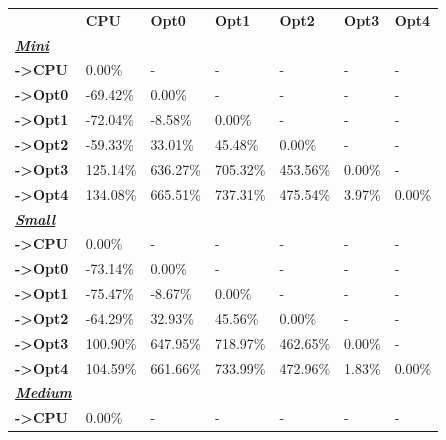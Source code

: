 \begin{table}[H]
    \centering
    \begin{tabular}{lllllll}
    \rowcolor[HTML]{DAE8FC} \ &  \textbf{CPU} &  \textbf{Opt0} &  \textbf{Opt1} &  \textbf{Opt2} &  \textbf{Opt3} &  \textbf{Opt4} \\
    \cellcolor[HTML]{DAE8FC} \textbf{\textbf{{\emph{{\underline{{Mini}}}}}}} &  &  &  &  &  &  \\
    \rowcolor[HTML]{EFEFEF} \cellcolor[HTML]{DAE8FC} \textbf{->CPU} & 0.00\% & - & - & - & - & - \\
    \cellcolor[HTML]{DAE8FC} \textbf{->Opt0} & -69.42\% & 0.00\% & - & - & - & - \\
    \rowcolor[HTML]{EFEFEF} \cellcolor[HTML]{DAE8FC} \textbf{->Opt1} & -72.04\% & -8.58\% & 0.00\% & - & - & - \\
    \cellcolor[HTML]{DAE8FC} \textbf{->Opt2} & -59.33\% & 33.01\% & 45.48\% & 0.00\% & - & - \\
    \rowcolor[HTML]{EFEFEF} \cellcolor[HTML]{DAE8FC} \textbf{->Opt3} & 125.14\% & 636.27\% & 705.32\% & 453.56\% & 	0.00\% & - \\
    \cellcolor[HTML]{DAE8FC} \textbf{->Opt4} & 134.08\% & 665.51\% & 737.31\% & 475.54\% & 	3.97\% & 	0.00\% \\
    \rowcolor[HTML]{EFEFEF} \cellcolor[HTML]{DAE8FC} \textbf{\textbf{{\emph{{\underline{{Small}}}}}}} &  &  &  &  &  &  \\
    \cellcolor[HTML]{DAE8FC} \textbf{->CPU} & 0.00\% & - & - & - & - & - \\
    \rowcolor[HTML]{EFEFEF} \cellcolor[HTML]{DAE8FC} \textbf{->Opt0} & -73.14\% & 0.00\% & - & - & - & - \\
    \cellcolor[HTML]{DAE8FC} \textbf{->Opt1} & -75.47\% & -8.67\% & 0.00\% & - & - & - \\
    \rowcolor[HTML]{EFEFEF} \cellcolor[HTML]{DAE8FC} \textbf{->Opt2} & -64.29\% & 32.93\% & 45.56\% & 0.00\% & - & - \\
    \cellcolor[HTML]{DAE8FC} \textbf{->Opt3} & 100.90\% & 647.95\% & 718.97\% & 462.65\% & 	0.00\% & - \\
    \rowcolor[HTML]{EFEFEF} \cellcolor[HTML]{DAE8FC} \textbf{->Opt4} & 104.59\% & 661.66\% & 733.99\% & 472.96\% & 	1.83\% & 	0.00\% \\
    \cellcolor[HTML]{DAE8FC} \textbf{\textbf{{\emph{{\underline{{Medium}}}}}}} &  &  &  &  &  &  \\
    \rowcolor[HTML]{EFEFEF} \cellcolor[HTML]{DAE8FC} \textbf{->CPU} & 0.00\% & - & - & - & - & - \\

\end{tabular}
\end{table}
